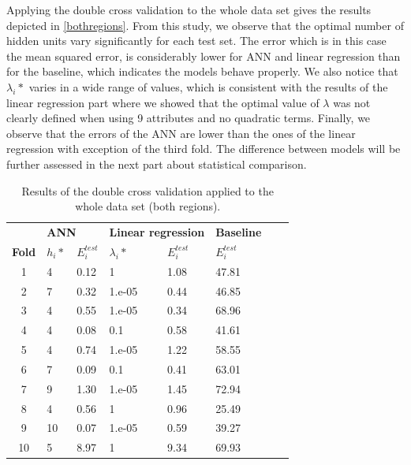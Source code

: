 \documentclass[10pt]{article}
\numberwithin{equation}{section}
\numberwithin{figure}{section}
\numberwithin{table}{section}
\begin{document}
Applying the double cross validation to the whole data set gives the results depicted in \autoref{bothregions}. From this study, we observe that the optimal number of hidden units vary significantly for each test set. The error which is in this case the mean squared error, is considerably lower for ANN and linear regression than for the baseline, which indicates the models behave properly. We also notice that $\lambda_i*$ varies in a wide range of values, which is consistent with the results of the linear regression part where we showed that the optimal value of $\lambda$ was not clearly defined when using 9 attributes and no quadratic terms. Finally, we observe that the errors of the ANN are lower than the ones of the linear regression with exception of the third fold. The difference between models will be further assessed in the next part about statistical comparison.


\begin{table}[H]
\centering
\begin{tabular}{l|l|l|l|l|l|ll}
\cline{2-6}
                         & \multicolumn{2}{l|}{\textbf{ANN}} & \multicolumn{2}{l|}{\textbf{Linear regression}} & \textbf{Baseline} &  &  \\ \cline{1-6}
\multicolumn{1}{|l|}{\textbf{Fold}}  & \textbf{$h_i*$} & \textbf{$E_i^{test}$} & \textbf{$\lambda_i*$}  & \textbf{$E_i^{test}$}  & \textbf{$E_i^{test}$} &  &  \\ \cline{1-6}
\multicolumn{1}{|c|}{1}  & 4        & 0.12     & 1                  & 1.08          & 47.81 &  &  \\ \cline{1-6}
\multicolumn{1}{|c|}{2}  & 7        & 0.32      & 1.e-05           & 0.44          & 46.85 &  &  \\ \cline{1-6}
\multicolumn{1}{|c|}{3}  & 4        & 0.55      & 1.e-05           & 0.34          & 68.96  &  &  \\ \cline{1-6}
\multicolumn{1}{|c|}{4}  & 4        & 0.08      & 0.1                & 0.58          & 41.61  &  &  \\ \cline{1-6}
\multicolumn{1}{|c|}{5}  & 4        & 0.74      & 1.e-05           & 1.22          & 58.55 &  &  \\ \cline{1-6}
\multicolumn{1}{|c|}{6}  & 7        & 0.09      & 0.1                & 0.41         & 63.01 &  &  \\ \cline{1-6}
\multicolumn{1}{|c|}{7}  & 9        & 1.30      & 1.e-05           & 1.45          & 72.94  &  &  \\ \cline{1-6}
\multicolumn{1}{|c|}{8}  & 4        & 0.56      & 1                  & 0.96          & 25.49 &  &  \\ \cline{1-6}
\multicolumn{1}{|c|}{9}  & 10       & 0.07      & 1.e-05           & 0.59          & 39.27  &  &  \\ \cline{1-6}
\multicolumn{1}{|c|}{10} & 5        & 8.97      & 1                  & 9.34          & 69.93 &  &  \\ \cline{1-6}
\end{tabular}
\caption{Results of the double cross validation applied to the whole data set (both regions).}
\label{bothregions}
\end{table}
\end{document}
